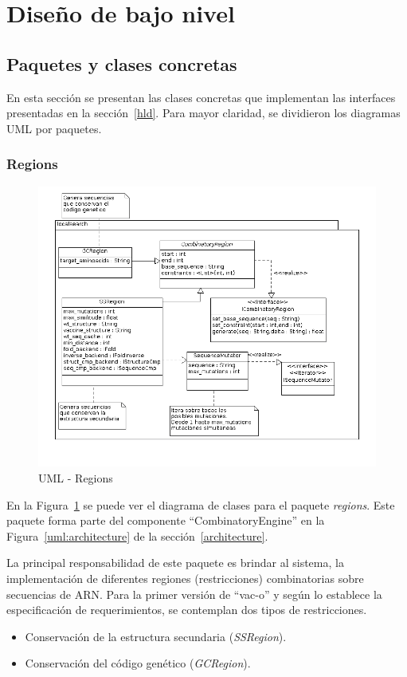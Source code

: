 \section{Dise\~no de bajo nivel}
\label{lld}  
  \subsection{Paquetes y clases concretas}
  En esta secci\'on se presentan las clases concretas que implementan las
interfaces presentadas en la secci\'on~\ref{hld}. Para mayor claridad, se
dividieron los diagramas UML por paquetes.

  \subsubsection{Regions}   
    \begin{figure}
      \centering
      \includegraphics[scale=0.5]{lld-regions.png}  
      \caption{UML - Regions}
      \label{uml:lld-regions}
    \end{figure}

  En la Figura~\ref{uml:lld-regions} se puede ver el diagrama de clases
para el paquete \textit{regions}. Este paquete forma parte del componente
``CombinatoryEngine'' en la Figura~\ref{uml:architecture} de la
secci\'on~\ref{architecture}.

  La principal responsabilidad de este paquete es brindar al sistema, la
implementaci\'on de diferentes regiones (restricciones) combinatorias sobre
secuencias de ARN. Para la primer versi\'on de ``vac-o'' y seg\'un lo establece
la especificaci\'on de requerimientos, se contemplan dos tipos de restricciones.
  \begin{itemize}
   \item Conservaci\'on de la estructura secundaria (\textit{SSRegion}).
   \item Conservaci\'on del c\'odigo gen\'etico (\textit{GCRegion}).
  \end{itemize}

